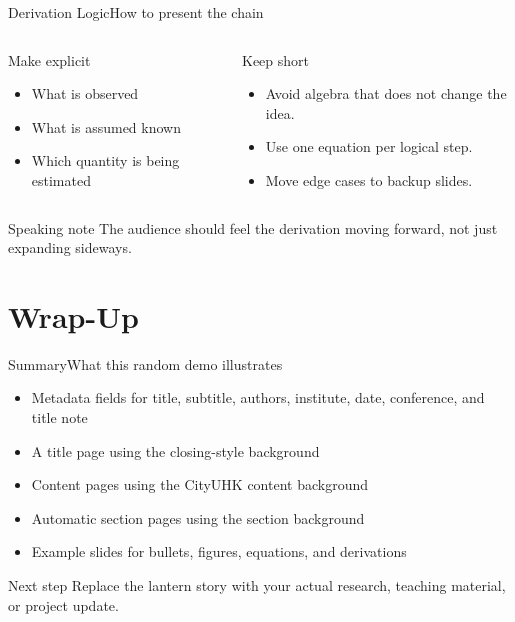 \documentclass[aspectratio=169,professionalfonts]{beamer}
\begin{document}
\begin{frame}{Derivation Logic}{How to present the chain}
  \begin{columns}[T,totalwidth=\textwidth]
    \begin{block}{Make explicit}
      \begin{itemize}
        \item What is observed
        \item What is assumed known
        \item Which quantity is being estimated
      \end{itemize}
    \end{block}

    \begin{alertblock}{Keep short}
      \begin{itemize}
        \item Avoid algebra that does not change the idea.
        \item Use one equation per logical step.
        \item Move edge cases to backup slides.
      \end{itemize}
    \end{alertblock}
  \end{columns}

  \vspace{0.15cm}
  \begin{exampleblock}{Speaking note}
    The audience should feel the derivation moving forward, not just expanding sideways.
  \end{exampleblock}
\end{frame}

\section{Wrap-Up}

\begin{frame}{Summary}{What this random demo illustrates}
  \begin{itemize}
    \item Metadata fields for title, subtitle, authors, institute, date, conference, and title note
    \item A title page using the closing-style background
    \item Content pages using the CityUHK content background
    \item Automatic section pages using the section background
    \item Example slides for bullets, figures, equations, and derivations
  \end{itemize}

  \vspace{0.25cm}
  \begin{block}{Next step}
    Replace the lantern story with your actual research, teaching material, or project update.
  \end{block}
\end{frame}

\end{document}
